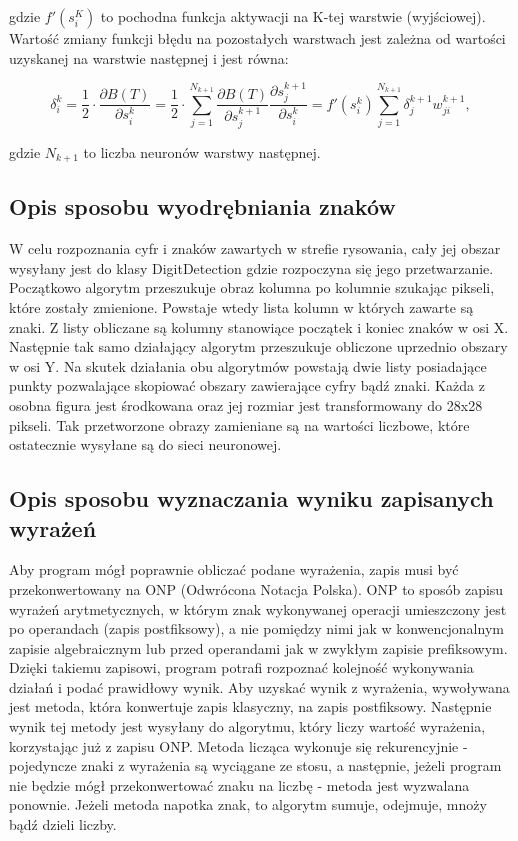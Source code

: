 \documentclass[12pt,a4paper]{article}
\begin{document}
    \noindent gdzie $f'(s^K_i)$ to pochodna funkcja aktywacji na K-tej warstwie (wyjściowej). Wartość zmiany funkcji błędu na pozostałych warstwach jest zależna od wartości uzyskanej na warstwie następnej i jest równa:
    
    \begin{equation*}
        \delta^k_i = \frac{1}{2} \cdot \frac{\partial B(T)}{\partial s^k_i} = \frac{1}{2} \cdot \sum_{j=1}^{N_{k+1}} \frac{\partial B(T)}{\partial s_j^{k+1}} \frac{\partial s_j^{k+1}}{\partial s^k_i} = f'(s^k_i) \sum_{j=1}^{N_{k+1}} \delta^{k+1}_j w^{k+1}_{ji},
    \end{equation*}
    
    \noindent gdzie $N_{k+1}$ to liczba neuronów warstwy następnej.
\subsection*{Opis sposobu wyodrębniania znaków}
	\hspace{20pt} W celu rozpoznania cyfr i znaków zawartych w strefie rysowania, cały jej obszar wysyłany jest do klasy DigitDetection gdzie rozpoczyna się jego przetwarzanie. Początkowo algorytm przeszukuje obraz kolumna po kolumnie szukając pikseli, które zostały zmienione. Powstaje wtedy lista kolumn w których zawarte są znaki. Z listy obliczane są kolumny stanowiące początek i koniec znaków w osi X. Następnie tak samo działający algorytm przeszukuje obliczone uprzednio obszary w osi Y. Na skutek działania obu algorytmów powstają dwie listy posiadające punkty pozwalające skopiować obszary zawierające cyfry bądź znaki. Każda z osobna figura jest środkowana oraz jej rozmiar jest transformowany do 28x28 pikseli. Tak przetworzone obrazy zamieniane są na wartości liczbowe, które ostatecznie wysyłane są do sieci neuronowej.
\subsection*{Opis sposobu wyznaczania wyniku zapisanych wyrażeń}

    \hspace{20pt}Aby program mógł poprawnie obliczać podane wyrażenia, zapis musi być przekonwertowany na ONP (Odwrócona Notacja Polska). ONP to sposób zapisu wyrażeń arytmetycznych, w którym znak wykonywanej operacji umieszczony jest po operandach (zapis postfiksowy), a nie pomiędzy nimi jak w konwencjonalnym zapisie algebraicznym lub przed operandami jak w zwykłym zapisie prefiksowym. Dzięki takiemu zapisowi, program potrafi rozpoznać kolejność wykonywania działań i podać prawidłowy wynik. Aby uzyskać wynik z wyrażenia, wywoływana jest metoda, która konwertuje zapis klasyczny, na zapis postfiksowy. Następnie wynik tej metody jest wysyłany do algorytmu, który liczy wartość wyrażenia, korzystając już z zapisu ONP. Metoda licząca wykonuje się rekurencyjnie - pojedyncze znaki z wyrażenia są wyciągane ze stosu, a następnie, jeżeli program nie będzie mógł przekonwertować znaku na liczbę - metoda jest wyzwalana ponownie. Jeżeli metoda napotka znak, to algorytm sumuje, odejmuje, mnoży bądź dzieli liczby. 
\end{document}
